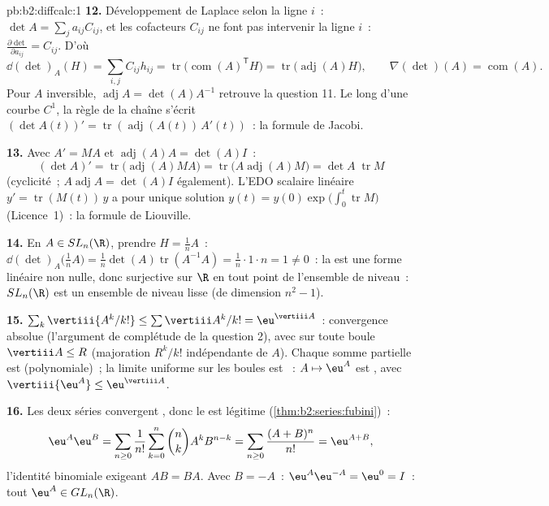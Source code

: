 \begin{solution}{pb:b2:diffcalc:1}
\textbf{12.} Développement de Laplace selon la ligne $i$~: $\det A =
\sum_j a_{ij}C_{ij}$, et les cofacteurs $C_{ij}$ ne font pas
intervenir la ligne $i$~: $\frac{\partial\det}{\partial a_{ij}} = C_{ij}$.
D'où
\[
\dd(\det)_A(H) = \sum_{i,j}C_{ij}h_{ij}
= \operatorname{tr}\bigl(\operatorname{com}(A)^{\mathsf T}
H\bigr)
= \operatorname{tr}\bigl(\operatorname{adj}(A)H\bigr),
\qquad
\nabla(\det)(A) = \operatorname{com}(A) .
\]
Pour $A$ inversible, $\operatorname{adj}A = \det(A)A^{-1}$
retrouve la question 11. Le long d'une courbe $C^1$, la règle de la
chaîne s'écrit $(\det A(t))' = \operatorname{tr}(\operatorname{adj}
(A(t))\,A'(t))$~: la formule de Jacobi.

\textbf{13.} Avec $A' = MA$ et
$\operatorname{adj}(A)A = \det(A)I$~:
\[
(\det A)' = \operatorname{tr}\bigl(\operatorname{adj}(A)MA
\bigr)
= \operatorname{tr}\bigl(A\operatorname{adj}(A)M\bigr)
= \det A\;\operatorname{tr}M
\]
(cyclicité~; $A\operatorname{adj}A = \det(A) I$ également). L'EDO
scalaire linéaire $y' = \operatorname{tr}(M(t))\,y$ a pour
unique solution $y(t) = y(0)\exp\bigl(\int_0^t
\operatorname{tr}M\bigr)$ (Licence~1)~: la formule de Liouville.

\textbf{14.} En $A \in SL_n(\R)$, prendre $H = \frac1nA$~:
$\dd(\det)_A\bigl(\tfrac1nA\bigr) = \frac1n\det(A)
\operatorname{tr}(A^{-1}A) = \frac1n\cdot1\cdot n = 1 \neq 0$~:
la  est une forme linéaire non nulle, donc surjective
sur $\R$ en tout point de l'ensemble de niveau~: $SL_n(\R)$ est un
ensemble de niveau lisse (de dimension $n^2 - 1$).

\textbf{15.} $\sum_k\vertiii{A^k/k!} \leq
\sum\vertiii A^k/k! = \eu^{\vertiii A}$~: convergence absolue
(l'argument de complétude de la question 2), avec  sur toute boule $\vertiii A \leq R$ (majoration $R^k/k!$
indépendante de $A$). Chaque somme partielle est 
(polynomiale)~; la limite uniforme sur les boules est ~: $A
\mapsto \eu^A$ est , avec $\vertiii{\eu^A} \leq
\eu^{\vertiii A}$.

\textbf{16.} Les deux séries convergent , donc le  est légitime (\cref{thm:b2:series:fubini})~:
\[
\eu^A\eu^B = \sum_{n\geq0}\frac{1}{n!}\sum_{k=0}^n\binom
nkA^kB^{n-k}
= \sum_{n\geq0}\frac{(A+B)^n}{n!} = \eu^{A+B},
\]
l'identité binomiale exigeant $AB = BA$. Avec $B = -A$~:
$\eu^A\eu^{-A} = \eu^0 = I$~: tout $\eu^A \in GL_n(\R)$.


\end{solution}
